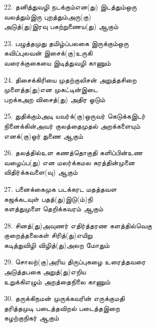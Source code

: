 22. தனித்துவழி நடக்கும்என(து) இடத்தும்ஒரு\\
         வலத்தும்இரு புறத்தும்அரு(கு)\\
         அடுத்(து)இரவு பகற்றுணைய(து) ஆகும் \thiru



23. பழுத்தமுது தமிழ்ப்பலகை இருக்கும்ஒரு\\
         கவிப்புலவன் இசைக்(கு)உருகி\\
         வரைக்குகையை இடித்துவழி காணும் \thiru



24. திசைக்கிரியை முதற்குலிசன் அறுத்தசிறை\\
         முளைத்த(து)என முகட்டின்இடை\\
         பறக்கஅற விசைத்(து) அதிர ஓடும் \thiru



25. துதிக்கும்அடி யவர்க்(கு)ஒருவர் கெடுக்கஇடர்\\
         நினைக்கின்அவர் குலத்தைமுதல் அறக்களையும்\\
         எனக்(கு)ஓர் துணை ஆகும் \thiru



26. தலத்தில்உள கணத்தொகுதி களிப்பின்உண\\
         வழைப்ப(து) என மலர்க்கமல கரத்தின்முனை\\
         விதிர்க்கவளை(வு) ஆகும் \thiru



27. பனைக்கைமுக படக்கரட மதத்தவள\\
         கஜக்கடவுள் பதத்(து)இடு(ம்)நி\\
         களத்துமுளை தெறிக்கவரம் ஆகும் \thiru



28. சினத்(து)அவுணர் எதிர்த்தரண களத்தில்வெகு\\
         குறைத்தலைகள் சிரித்(து)எயிறு\\
         கடித்துவிழி விழித்(து)அலற மோதும் \thiru



29. சொலற்(கு)அரிய திருப்புகழை உரைத்தவரை\\
         அடுத்தபகை அறுத்(து)எறிய\\
         உறுக்கிஎழும் அறத்தைநிலை காணும் \thiru



30. தருக்கிநமன் முருக்கவரின் எருக்குமதி\\
         தரித்தமுடி படைத்தவிறல் படைத்தஇறை\\
         கழற்குநிகர் ஆகும் \thiru



